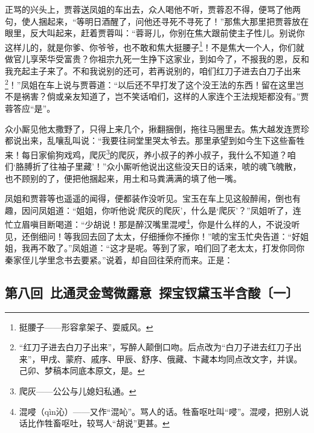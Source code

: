 \par 正骂的兴头上，贾蓉送凤姐的车出去，众人喝他不听，贾蓉忍不得，便骂了他两句，使人捆起来，“等明日酒醒了，问他还寻死不寻死了！”那焦大那里把贾蓉放在眼里，反大叫起来，赶着贾蓉叫：“蓉哥儿，你别在焦大跟前使主子性儿。别说你这样儿的，就是你爹、你爷爷，也不敢和焦大挺腰子\footnote{挺腰子——形容拿架子、耍威风。}！不是焦大一个人，你们就做官儿享荣华受富贵？你祖宗九死一生挣下这家业，到如今了，不报我的恩，反和我充起主子来了。不和我说别的还可，若再说别的，咱们红刀子进去白刀子出来\footnote{“红刀子进去白刀子出来”，写醉人颠倒口吻。后点改为“白刀子进去红刀子出来”，甲戌、蒙府、戚序、甲辰、舒序、俄藏、卞藏本均同点改文字，并误。己卯、梦稿本同底本原文，是。}！”凤姐在车上说与贾蓉道：“以后还不早打发了这个没王法的东西！留在这里岂不是祸害？倘或亲友知道了，岂不笑话咱们，这样的人家连个王法规矩都没有。”贾蓉答应“是”。
\par 众小厮见他太撒野了，只得上来几个，揪翻捆倒，拖往马圈里去。焦大越发连贾珍都说出来，乱嚷乱叫说：“我要往祠堂里哭太爷去。那里承望到如今生下这些畜牲来！每日家偷狗戏鸡，爬灰\footnote{爬灰——公公与儿媳妇私通。}的爬灰，养小叔子的养小叔子，我什么不知道？咱们‘胳膊折了往袖子里藏’！”众小厮听他说出这些没天日的话来，唬的魂飞魄散，也不顾别的了，便把他捆起来，用土和马粪满满的填了他一嘴。
\par 凤姐和贾蓉等也遥遥的闻得，便都装作没听见。宝玉在车上见这般醉闹，倒也有趣，因问凤姐道：“姐姐，你听他说‘爬灰的爬灰’，什么是‘爬灰’？”凤姐听了，连忙立眉嗔目断喝道：“少胡说！那是醉汉嘴里混唚\footnote{混唚（qìn沁）——又作“混吣”。骂人的话。牲畜呕吐叫“唚”。混唚，把别人说话比作牲畜呕吐，较骂人“胡说”更甚。}，你是什么样的人，不说没听见，还倒细问！等我回去回了太太，仔细捶你不捶你！”唬的宝玉忙央告道：“好姐姐，我再不敢了。”凤姐道：“这才是呢。等到了家，咱们回了老太太，打发你同你秦家侄儿学里念书去要紧。”说着，却自回往荣府而来。正是：

\subsection*{第八回\ 比通灵金莺微露意\ 探宝钗黛玉半含酸〔一〕}






